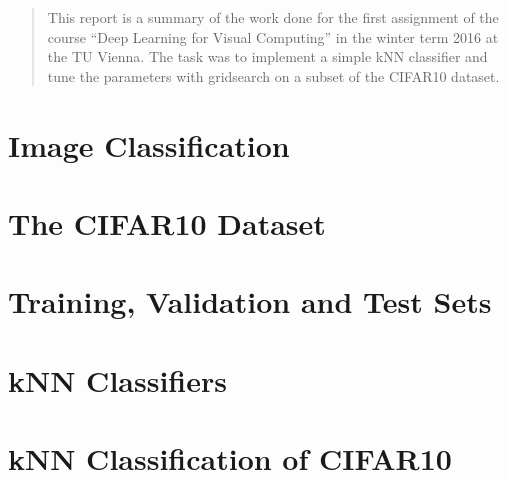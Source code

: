\newcommand{\ttitle}{kNN Classification and Histograms of Oriented Gradients}
\hyphenation{}
\maketitle



\begin{abstract}
This report is a summary of the work done for the first assignment of the course ``Deep Learning for Visual Computing'' in the winter term 2016 at the TU Vienna. The task was to implement a simple kNN classifier and tune the parameters with gridsearch on a subset of the CIFAR10 dataset.
\end{abstract}



\section{Image Classification} %

\section{The CIFAR10 Dataset} %

\section{Training, Validation and Test Sets} %

\section{kNN Classifiers} %

\clearpage
\section{kNN Classification of CIFAR10} %



